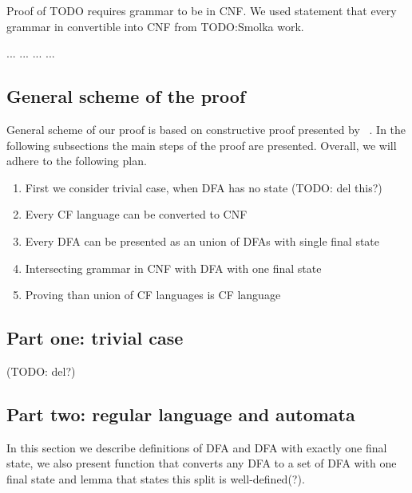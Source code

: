 Proof of TODO requires grammar to be in CNF. We used statement that every grammar in convertible into CNF from TODO:Smolka work.

... ... ... ... 

\subsection{General scheme of the proof}

General scheme of our proof is based on constructive proof presented by ~\cite{!!!}. In the following subsections the main steps of the proof are presented. Overall, we will adhere to the following plan. 

\begin{enumerate}
    \item First we consider trivial case, when DFA has no state (TODO: del this?)
    \item Every CF language can be converted to CNF
    \item Every DFA can be presented as an union of DFAs with single final state
    \item Intersecting grammar in CNF with DFA with one final state
    \item Proving than union of CF languages is CF language
\end{enumerate}

\subsection{Part one: trivial case}


(TODO: del?)

\subsection{Part two: regular language and automata}

In this section we describe definitions of DFA and DFA with exactly one final state, we also present function that converts any DFA to a set of DFA with one final state and lemma that states this split is well-defined(?).

